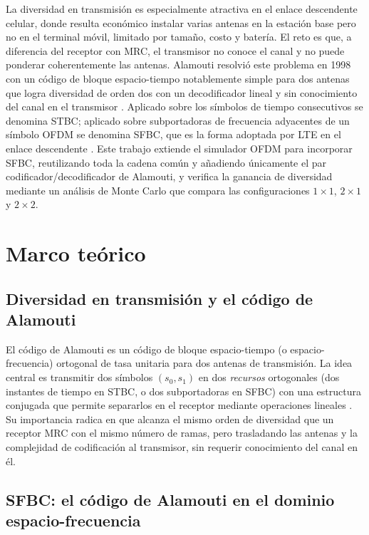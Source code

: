 \documentclass[conference,onecolumn]{IEEEtran}
\begin{document}
La diversidad en transmisi\'on es especialmente atractiva en el enlace descendente celular, donde resulta econ\'omico instalar varias antenas en la estaci\'on base pero no en el terminal m\'ovil, limitado por tama\~no, costo y bater\'ia. El reto es que, a diferencia del receptor con MRC, el transmisor no conoce el canal y no puede ponderar coherentemente las antenas. Alamouti resolvi\'o este problema en 1998 con un c\'odigo de bloque espacio-tiempo notablemente simple para dos antenas que logra diversidad de orden dos con un decodificador lineal y sin conocimiento del canal en el transmisor \cite{alamouti1998}. Aplicado sobre los s\'imbolos de tiempo consecutivos se denomina STBC; aplicado sobre subportadoras de frecuencia adyacentes de un s\'imbolo OFDM se denomina SFBC, que es la forma adoptada por LTE en el enlace descendente \cite{sesia2011lte,3gpp36211}. Este trabajo extiende el simulador OFDM para incorporar SFBC, reutilizando toda la cadena com\'un y a\~nadiendo \'unicamente el par codificador/decodificador de Alamouti, y verifica la ganancia de diversidad mediante un an\'alisis de Monte Carlo que compara las configuraciones $1\times1$, $2\times1$ y $2\times2$.

\section{Marco te\'orico}

\subsection{Diversidad en transmisi\'on y el c\'odigo de Alamouti}

El c\'odigo de Alamouti es un c\'odigo de bloque espacio-tiempo (o espacio-frecuencia) ortogonal de tasa unitaria para dos antenas de transmisi\'on. La idea central es transmitir dos s\'imbolos $(s_0,s_1)$ en dos \emph{recursos} ortogonales (dos instantes de tiempo en STBC, o dos subportadoras en SFBC) con una estructura conjugada que permite separarlos en el receptor mediante operaciones lineales \cite{alamouti1998,tarokh1999}. Su importancia radica en que alcanza el mismo orden de diversidad que un receptor MRC con el mismo n\'umero de ramas, pero trasladando las antenas y la complejidad de codificaci\'on al transmisor, sin requerir conocimiento del canal en \'el.

\subsection{SFBC: el c\'odigo de Alamouti en el dominio espacio-frecuencia}
\end{document}
